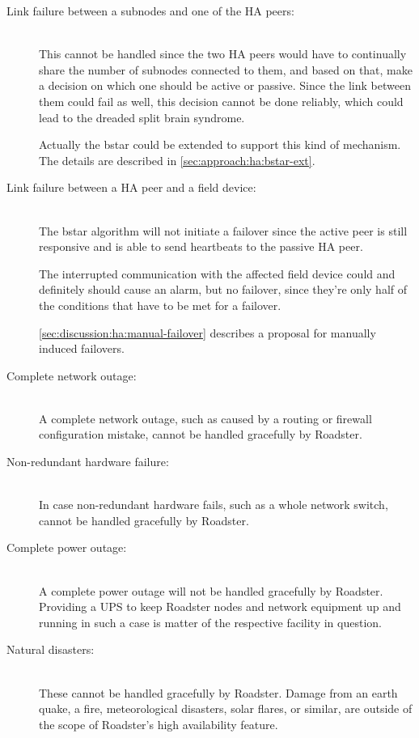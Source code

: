 \begin{description}
	\item [Link failure between a subnodes and one of the HA peers:]\hfill\\

		This cannot be handled since the two HA peers would have to
		continually share the number of subnodes connected to them, and
		based on that, make a decision on which one should be active or
		passive. Since the link between them could fail as well, this
		decision cannot be done reliably, which could lead to the
		dreaded split brain syndrome.

		Actually the \gls{bstar} could be extended to support this kind
		of mechanism. The details are described in
		\autoref{sec:approach:ha:bstar-ext}.


	\item [Link failure between a HA peer and a field device:]\hfill\\
		The \gls{bstar} algorithm will not initiate a failover since the
		active peer is still responsive and is able to send heartbeats to the passive HA peer.

		The interrupted communication with the affected field device
		could and definitely should cause an alarm, but no failover,
		since they're only half of the conditions that have to be met
		for a failover.

		\autoref{sec:discussion:ha:manual-failover} describes a
		proposal for manually induced failovers.

	\item [ Complete network outage:]\hfill\\
		A complete network outage, such as caused by a routing or
		firewall configuration mistake, cannot be handled gracefully by
		Roadster.

	\item [ Non-redundant hardware failure:]\hfill\\
		In case non-redundant hardware fails, such as a whole network
		switch, cannot be handled gracefully by Roadster.

	\item [ Complete power outage:]\hfill\\
		A complete power outage will not be handled gracefully by
		Roadster. Providing a \gls{UPS} to keep Roadster nodes and
		network equipment up and running in such a case is matter of
		the respective facility in question.

	\item [ Natural disasters:]\hfill\\
		These cannot be handled gracefully by Roadster. Damage from an
		earth quake, a fire, meteorological disasters, solar flares, or
		similar, are outside of the scope of Roadster's high
		availability feature.
\end{description}

